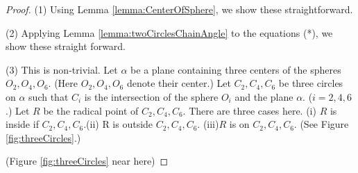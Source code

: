 \documentclass[suppldata, dvipdfmx]{interact}
\theoremstyle{plain}%
\theoremstyle{definition}
\theoremstyle{remark}
\theoremstyle{problemstyle}
\begin{document}


 
\begin{proof}
(1) Using Lemma \ref{lemma:CenterOfSphere}, we show these straightforward.\par
(2) Applying Lemma \ref{lemma:twoCirclesChainAngle} to the equations (*), we show these straight forward.  \par
(3) This is non-trivial. 
Let $\alpha$ be a plane containing three centers of the spheres $O_2, O_4, O_6$.  (Here $O_2, O_4, O_6$ denote their center.)  Let
 $C_2, C_4, C_6$ be three circles on $\alpha$ such that $C_i$ is the
 intersection of the sphere $O_i$ and the plane $\alpha$. ($i=2, 4, 6$.)
Let $R$ be the radical point of $C_2, C_4, C_6$. There are three cases
 here.
(i) $R$ is inside if $C_2, C_4, C_6$.(ii) R is outside $C_2, C_4, C_6$.
(iii)$R$ is on $C_2, C_4, C_6$. (See Figure \ref{fig:threeCircles}.)

\noindent(Figure \ref{fig:threeCircles}
 near here)


\end{proof}
\end{document}
